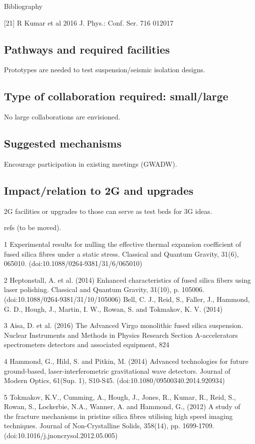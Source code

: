 Bibliography

[21] R Kumar et al 2016 J. Phys.: Conf. Ser. 716 012017

\subsection{Pathways and required facilities}
Prototypes are needed to test suspension/seismic isolation designs. 
\subsection{Type of collaboration required:  small/large}
No large collaborations are envisioned. 
\subsection{Suggested mechanisms}
Encourage participation in existing meetings (GWADW). 
\subsection{Impact/relation to 2G and upgrades}
2G facilities or upgrades to those can serve as test beds for 3G ideas. 

refs (to be moved).

1 Experimental results for nulling the effective thermal expansion coefficient of fused silica fibres under a static stress. Classical and Quantum Gravity, 31(6), 065010. (doi:10.1088/0264-9381/31/6/065010)

2 Heptonstall, A. et al. (2014) Enhanced characteristics of fused silica fibers using laser polishing. Classical and Quantum Gravity, 31(10), p. 105006. (doi:10.1088/0264-9381/31/10/105006)
Bell, C. J., Reid, S., Faller, J., Hammond, G. D., Hough, J., Martin, I. W., Rowan, S. and Tokmakov, K. V. (2014) 

3 Aisa, D. et al. (2016) The Advanced Virgo monolithic fused silica suspension. Nuclear Instruments and Methods in Physics Research Section A-accelerators spectrometers detectors and associated equipment, 824

4 Hammond, G., Hild, S. and Pitkin, M. (2014) Advanced technologies for future ground-based, laser-interferometric gravitational wave detectors. Journal of Modern Optics, 61(Sup. 1), S10-S45. (doi:10.1080/09500340.2014.920934)

5 Tokmakov, K.V., Cumming, A., Hough, J., Jones, R., Kumar, R., Reid, S., Rowan, S., Lockerbie, N.A., Wanner, A. and Hammond, G., (2012) A study of the fracture mechanisms in pristine silica fibres utilising high speed imaging techniques. Journal of Non-Crystalline Solids, 358(14), pp. 1699-1709. 
(doi:10.1016/j.jnoncrysol.2012.05.005)

